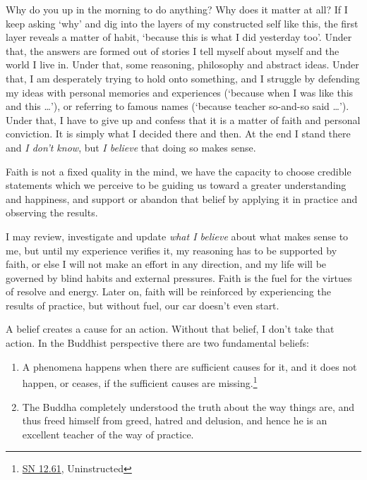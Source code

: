 Why do you up in the morning to do anything? Why does it matter at all?
If I keep asking `why' and dig into the layers of my constructed self
like this, the first layer reveals a matter of habit, `because this is
what I did yesterday too'. Under that, the answers are formed out of
stories I tell myself about myself and the world I live in. Under that,
some reasoning, philosophy and abstract ideas. Under that, I am
desperately trying to hold onto something, and I struggle by defending
my ideas with personal memories and experiences (`because when I was
like this and this \ldots{}'), or referring to famous names (`because
teacher so-and-so said \ldots{}'). Under that, I have to give up and
confess that it is a matter of faith and personal conviction. It is
simply what I decided there and then. At the end I stand there and
\emph{I don't know}, but \emph{I believe} that doing so makes sense.

Faith is not a fixed quality in the mind, we have the capacity to choose
credible statements which we perceive to be guiding us toward a greater
understanding and happiness, and support or abandon that belief by
applying it in practice and observing the results.

I may review, investigate and update \emph{what I believe} about what
makes sense to me, but until my experience verifies it, my reasoning has
to be supported by faith, or else I will not make an effort in any
direction, and my life will be governed by blind habits and external
pressures. Faith is the fuel for the virtues of resolve and energy.
Later on, faith will be reinforced by experiencing the results of
practice, but without fuel, our car doesn't even start.


A belief creates a cause for an action. Without that belief, I don't
take that action. In the Buddhist perspective there are two fundamental
beliefs:

\begin{enumerate}
\tightlist
\item
  A phenomena happens when there are sufficient causes for it, and it
  does not happen, or ceases, if the sufficient causes are
  missing.\footnote{\href{https://www.dhammatalks.org/suttas/SN/SN12_61.html}{SN
    12.61}, Uninstructed}
\item
  The Buddha completely understood the truth about the way things are,
  and thus freed himself from greed, hatred and delusion, and hence he
  is an excellent teacher of the way of practice.
\end{enumerate}

